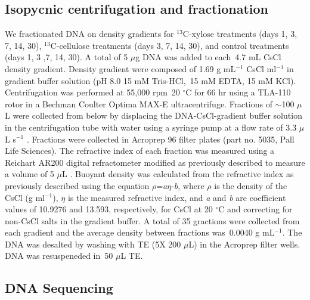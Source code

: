 \documentclass{article}
\begin{document}
\subsection{Isopycnic centrifugation and fractionation} 
We fractionated DNA on density gradients for $^{13}$C-xylose treatments (days
1, 3, 7, 14, 30), $^{13}$C-cellulose treatments (days 3, 7, 14, 30), and
control treatments (days 1, 3 ,7, 14, 30). A total of 5 $\mu$g DNA was added to
each~4.7 mL CsCl density gradient.  Density gradient were composed of 1.69
g mL$^{-1}$ CsCl ml$^{-1}$ in gradient buffer solution (pH 8.0 15 mM
Tris-HCl,~15 mM EDTA, 15 mM KCl). Centrifugation was performed at 55,000 rpm~20
$^{\circ}$C for 66 hr using a TLA-110 rotor in a Bechman Coulter Optima MAX-E
ultracentrifuge. Fractions of $\sim$100 $\mu$L were collected from below by
displacing the DNA-CsCl-gradient buffer solution in the centrifugation tube
with water using a syringe pump at a flow rate of 3.3 $\mu$L s$^{-1}$
\citep{Manefield_2002}. Fractions were collected in Acroprep 96 filter plates (part no. 5035, Pall Life
Sciences). The refractive index of each fraction was measured using a Reichart
AR200 digital refractometer modified as previously described to measure
a volume of 5 $\mu$L \citep{Buckley_2007}. Buoyant density was calculated from
the refractive index as previously described \citep{Buckley_2007} using the
equation $\rho$=\textit{a}$\eta$-\textit{b}, where $\rho$ is the density of the
CsCl (g ml$^{-1}$), $\eta$ is the measured refractive index, and \textit{a} and
\textit{b} are coefficient values of 10.9276 and 13.593, respectively, for CsCl
at 20 $^{\circ}$C \citep{9780408708036} and correcting for non-CsCl salts in
the gradient buffer. A total of 35 gractions were collected from each gradient
and the average density between fractions was~0.0040 g mL$^{-1}$. The DNA was
desalted by washing with TE (5X 200 $\mu$L) in the Acroprep filter wells. DNA
was resuspeneded in~50 $\mu$L TE. 

\subsection{DNA Sequencing}
\end{document}
